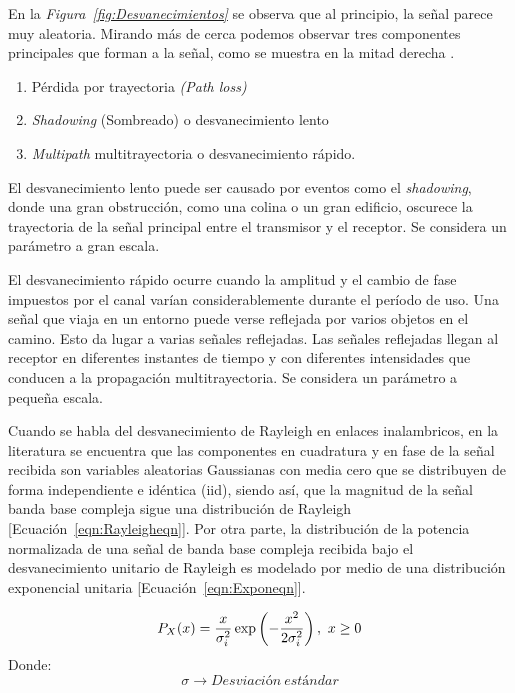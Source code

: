 En la \textit{Figura~\ref{fig:Desvanecimientos}} se observa que al principio, la señal parece muy aleatoria. Mirando más de cerca podemos observar tres componentes principales que forman a la señal, como se muestra en la mitad derecha \parencite{Mathuranathan2016}.
\begin{enumerate}
    \item  Pérdida por trayectoria \textit{(Path loss)}
    \item  \textit{Shadowing} (Sombreado) o desvanecimiento lento
    \item  \textit{Multipath} multitrayectoria o desvanecimiento rápido.
\end{enumerate}

El desvanecimiento lento puede ser causado por eventos como el \textit{shadowing}, donde una gran obstrucción, como una colina o un gran edificio, oscurece la trayectoria de la señal principal entre el transmisor y el receptor. Se considera un parámetro a gran escala.\newline

El desvanecimiento rápido ocurre cuando la amplitud y el cambio de fase impuestos por el canal varían considerablemente durante el período de uso. Una señal que viaja en un entorno puede verse reflejada por varios objetos en el camino. Esto da lugar a varias señales reflejadas. Las señales reflejadas llegan al receptor en diferentes instantes de tiempo y con diferentes intensidades que conducen a la propagación multitrayectoria. Se considera un parámetro a pequeña escala.\newline

Cuando se habla del desvanecimiento de Rayleigh en enlaces inalambricos, en la literatura \parencite{RayleighScienceDirect} se encuentra que las componentes en cuadratura y en fase de la señal recibida son variables aleatorias Gaussianas con media cero que se distribuyen de forma independiente e idéntica (iid), siendo así, que la magnitud de la señal banda base compleja sigue una distribución de Rayleigh [Ecuación~\ref{eqn:Rayleigheqn}]. Por otra parte, la distribución de la potencia normalizada de una señal de banda base compleja recibida bajo el desvanecimiento unitario de Rayleigh es modelado por medio de una distribución exponencial unitaria [Ecuación~\ref{eqn:Exponeqn}]. \label{DesvRayleigC2} \newline 

\begin{equation}
    P_{X}(x) = {x\over\sigma_{i}^{2}}\exp\left(-{x^{2}\over 2\sigma_{i}^{2}}\right),\ x\geq 0
    \label{eqn:Rayleigheqn}
\end{equation}
Donde:
\[\sigma\to Desviación\ estándar\] 

